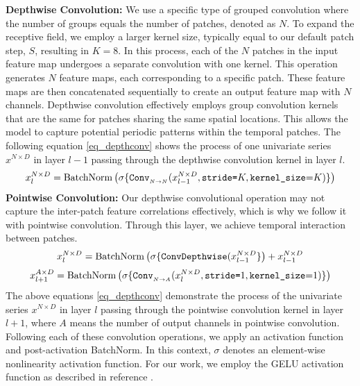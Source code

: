 \documentclass{article} \usepackage{iclr2024_conference,times}
\begin{document}
\textbf{Depthwise Convolution:} We use a specific type of grouped convolution where the number of groups equals the number of patches, denoted as $N$. To expand the receptive field, we employ a larger kernel size, typically equal to our default patch step, $S$, resulting in $K=8$. In this process, each of the $N$ patches in the input feature map undergoes a separate convolution with one kernel. This operation generates $N$ feature maps, each corresponding to a specific patch. These feature maps are then concatenated sequentially to create an output feature map with $N$ channels. Depthwise convolution effectively employs group convolution kernels that are the same for patches sharing the same spatial locations. This allows the model to capture potential periodic patterns within the temporal patches. The following equation \ref{eq_depthconv} shows the process of one univariate series $x^{N \times D}$ in layer $l-1$ passing through the depthwise convolution kernel in layer $l$.
\begin{equation}
	x^{N \times D}_{l} = \operatorname{BatchNorm}\left(\sigma\{\text{\texttt{Conv}}_{_{N \to N}}(x^{N \times D}_{l-1}, \text{\texttt{stride=}}K, \text{\texttt{kernel\_size}=}K)\}\right)
\label{eq_depthconv}
\end{equation}
\textbf{Pointwise Convolution:} Our depthwise convolutional operation may not capture the inter-patch feature correlations effectively, which is why we follow it with pointwise convolution. Through this layer, we achieve temporal interaction between patches. 
\begin{equation}
	x^{N \times D}_{l} = \operatorname{BatchNorm}\left(\sigma\{\text{\texttt{ConvDepthwise}}(x^{N \times D}_{l-1}\}\right) + x^{N \times D}_{l-1}
\end{equation}
\begin{equation}
	x^{A \times D}_{l+1} = \operatorname{BatchNorm}\left(\sigma\{\text{\texttt{Conv}}_{_{N \to A}}(x^{N \times D}_{l}, \text{\texttt{stride=}}1, \text{\texttt{kernel\_size}=}1)\}\right)
\end{equation}
The above equations \ref{eq_depthconv} demonstrate the process of the univariate series $x^{N \times D}$ in layer $l$ passing through the pointwise convolution kernel in layer $l+1$, where $A$ means the number of output channels in pointwise convolution. Following each of these convolution operations, we apply an activation function and post-activation BatchNorm. In this context, $\sigma$ denotes an element-wise nonlinearity activation function. For our work, we employ the GELU activation function as described in reference \citep{gelu}.
\end{document}
